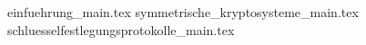 

{einfuehrung_main.tex}
{symmetrische_kryptosysteme_main.tex}
{schluesselfestlegungsprotokolle_main.tex}
